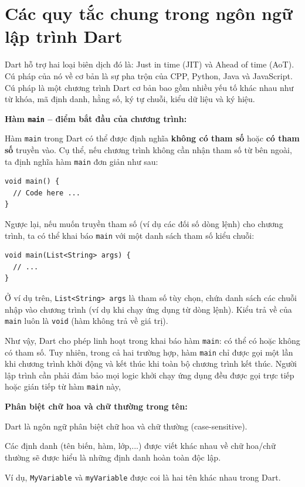 \documentclass[../DoAn.tex]{subfiles}
\numberwithin{figure}{chapter}
\begin{document}
\section{Các quy tắc chung trong ngôn ngữ lập trình Dart}
Dart hỗ trợ hai loại biên dịch đó là: Just in time (JIT) và Ahead of time (AoT). Cú pháp của nó về cơ bản là sự pha trộn của CPP, Python, Java và JavaScript.
Cú pháp là một chương trình Dart cơ bản bao gồm nhiều yếu tố khác nhau như từ khóa, mã định danh, hằng số, ký tự chuỗi, kiểu dữ liệu và ký hiệu. 

\textbf{Hàm \texttt{main} – điểm bắt đầu của chương trình:} 

Hàm \texttt{main} trong Dart có thể được định nghĩa \textbf{không có tham số} hoặc \textbf{có tham số} truyền vào. Cụ thể, nếu chương trình không cần nhận tham số từ bên ngoài, ta định nghĩa hàm \texttt{main} đơn giản như sau:

\begin{lstlisting}
void main() {
  // Code here ...
}    
\end{lstlisting}

Ngược lại, nếu muốn truyền tham số (ví dụ các đối số dòng lệnh) cho chương trình, ta có thể khai báo \texttt{main} với một danh sách tham số kiểu chuỗi:
\begin{lstlisting}
void main(List<String> args) {
  // ...
}
\end{lstlisting}

Ở ví dụ trên, \texttt{List<String> args} là tham số tùy chọn, chứa danh sách các chuỗi nhập vào chương trình (ví dụ khi chạy ứng dụng từ dòng lệnh). Kiểu trả về của \texttt{main} luôn là \texttt{void} (hàm không trả về giá trị).

Như vậy, Dart cho phép linh hoạt trong khai báo hàm \texttt{main}: có thể có hoặc không có tham số. Tuy nhiên, trong cả hai trường hợp, hàm \texttt{main} chỉ được gọi một lần khi chương trình khởi động và kết thúc khi toàn bộ chương trình kết thúc. Người lập trình cần phải đảm bảo mọi logic khởi chạy ứng dụng đều được gọi trực tiếp hoặc gián tiếp từ hàm \texttt{main} này,

\textbf{Phân biệt chữ hoa và chữ thường trong tên:} 

Dart là ngôn ngữ phân biệt chữ hoa và chữ thường (case-sensitive). 

Các định danh (tên biến, hàm, lớp,...) được viết khác nhau về chữ hoa/chữ thường sẽ được hiểu là những định danh hoàn toàn độc lập. 

Ví dụ, \texttt{MyVariable} và \texttt{myVariable} được coi là hai tên khác nhau trong Dart.
\end{document}
